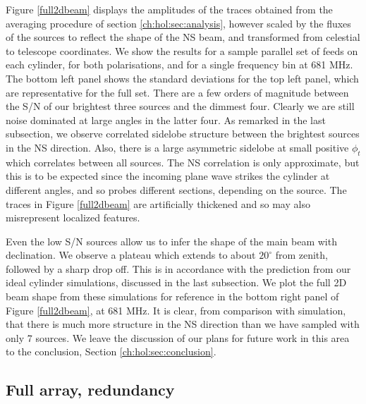 Figure \ref{full2dbeam} displays the amplitudes of the traces obtained from the averaging procedure of section \ref{ch:hol:sec:analysis}, however scaled by the fluxes of the sources to reflect the shape of the NS beam, and transformed from celestial to telescope coordinates. We show the results for a sample parallel set of feeds on each cylinder, for both polarisations, and for a single frequency bin at 681 MHz. The bottom left panel shows the standard deviations for the top left panel, which are representative for the full set. There are a few orders of magnitude between the S/N of our brightest three sources and the dimmest four. Clearly we are still noise dominated at large angles in the latter four. As remarked in the last subsection, we observe correlated sidelobe structure between the brightest sources in the NS direction. Also, there is a large asymmetric sidelobe at small positive $\phi_t$ which correlates between all sources. The NS correlation is only approximate, but this is to be expected since the incoming plane wave strikes the cylinder at different angles, and so probes different sections, depending on the source. The traces in Figure \ref{full2dbeam} are artificially thickened and so may also misrepresent localized features.

Even the low S/N sources allow us to infer the shape of the main beam with declination. We observe a plateau which extends to about $20^{\circ}$ from zenith, followed by a sharp drop off. This is in accordance with the prediction from our ideal cylinder simulations, discussed in the last subsection. We plot the full 2D beam shape from these simulations for reference in the bottom right panel of Figure \ref{full2dbeam}, at 681 MHz. It is clear, from comparison with simulation, that there is much more structure in the NS direction than we have sampled with only 7 sources. We leave the discussion of our plans for future work in this area to the conclusion, Section \ref{ch:hol:sec:conclusion}.

\subsection{Full array, redundancy} \label{ch:hol:sec:results:ss:fullarray}


